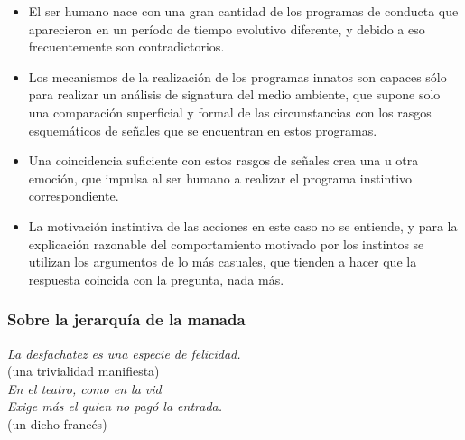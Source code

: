 \begin{itemize}

\item
  El ser humano nace con una gran cantidad de los programas de conducta
  que aparecieron en un período de tiempo evolutivo diferente, y debido
  a eso frecuentemente son contradictorios.
\item
  Los mecanismos de la realización de los programas innatos son capaces
  sólo para realizar un análisis de signatura del medio ambiente, que
  supone solo una comparación superficial y formal de las circunstancias
  con los rasgos esquemáticos de señales que se encuentran en estos
  programas.
\item
  Una coincidencia suficiente con estos rasgos de señales crea una u
  otra emoción, que impulsa al ser humano a realizar el programa
  instintivo correspondiente.
\item
  La motivación instintiva de las acciones en este caso no se entiende,
  y para la explicación razonable del comportamiento motivado por los
  instintos se utilizan los argumentos de lo más casuales, que tienden a
  hacer que la respuesta coincida con la pregunta, nada más.
\end{itemize}

\protect\hypertarget{M8}{}{}

\subsubsection{Sobre la jerarquía de la manada}

\noindent
\textit{La desfachatez es una especie de felicidad.}\\
(una trivialidad manifiesta)\\

\noindent
\textit{En el teatro, como en la vid}\\
\textit{Exige más el quien no pagó la entrada.}\\
(un dicho francés)\\



